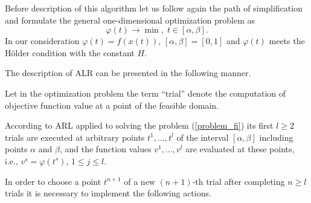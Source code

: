 \documentclass[]{interact}
\theoremstyle{plain}%
\theoremstyle{definition}
\theoremstyle{remark}
\begin{document}
Before description of this algorithm let us follow again the path of simplification and formulate the general one-dimensional optimization problem as
\begin{equation}\label{problem_fi}
\varphi(t) \rightarrow \min, \; t \in [\alpha,\beta].
\end{equation}
In our consideration $\varphi(t) = f(x(t))$, $[\alpha,\beta] = [0,1]$ and $\varphi(t)$  meets the H{\"o}lder condition with the constant $H$.

The description of ALR can be presented in the following manner.

Let in the optimization problem the term ``trial'' denote the computation of objective function value at a point of the feasible domain. 


According to ARL applied to solving the problem (\ref{problem_fi}) its first $l \geq 2$  trials are executed at arbitrary points $t^1, \dots, t^l$ of the interval $[\alpha, \beta]$ including points $\alpha$ and $\beta$, and the function values $v^1, \dots, v^l$ are evaluated at these points, i.e., $v^s=\varphi(t^s)$, $1 \leq j \leq l$.

In order to choose a point $t^{n+1}$ of a new $(n+1)$-th trial after completing $n \geq l$ trials it is necessary to implement the following actions.
\end{document}
